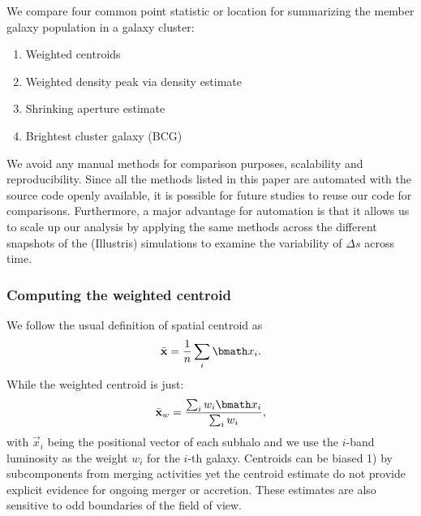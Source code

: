
We compare four common point statistic or location for summarizing 
the member galaxy population in a galaxy cluster:
\begin{enumerate}
\item Weighted centroids
\item Weighted density peak via density estimate  
\item Shrinking aperture estimate
\item Brightest cluster galaxy (BCG)
\end{enumerate}

We avoid any manual methods for
comparison purposes, scalability and reproducibility. 
Since all the methods listed in this
paper are automated with the source code openly available, 
it is possible for future studies to reuse our code for comparisons. 
Furthermore, a major advantage for automation is that it allows us  
to scale up our analysis by applying
the same methods across the different snapshots of the (Illustris) simulations to
examine the variability of $\Delta s$ across time. 


\subsubsection{Computing the weighted centroid}
\label{Unweighted}
We follow the usual definition of spatial centroid as 
\begin{equation}
	\bar{\bf x} = \frac{1}{n} \sum_i \vec{x}_i. 
\end{equation}
While the weighted centroid is just: 
\begin{equation}
	\bar{\bf x}_w = \frac{\sum_i w_i \vec{x}_i}{\sum_i w_i},
\end{equation}
with $\vec{x}_i$ being the positional vector of each subhalo 
and we use the $i$-band luminosity 
as the weight $w_i$ for the $i$-th galaxy.
Centroids can be biased 1) by subcomponents from merging activities yet the
centroid estimate do not provide explicit evidence for ongoing merger or 
accretion. These estimates are also sensitive to odd boundaries 
of the field of view.

